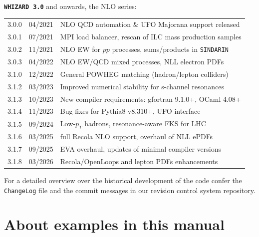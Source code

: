\documentclass[12pt]{book}
\newcommand{\ttt}[1]{\texttt{#1}}
\newcommand{\whizard}{\ttt{WHIZARD}}
\newcommand{\sindarin}{\ttt{SINDARIN}}
\begin{document}
\vspace{2cm}

{
{\bf \whizard\ \texttt{3.0}} and onwards, the NLO series:
\nopagebreak[4]
\begin{center}
  \begin{tabular}{|l|l|l|}\hline
    3.0.0 & 04/2021 & NLO QCD automation \& UFO Majorana support
    released
    \\
    3.0.1 & 07/2021 & MPI load balancer, rescan of ILC mass production
    samples
    \\
    3.0.2 & 11/2021 & NLO EW for $pp$ processes, sums/products in
    \sindarin\
    \\
    3.0.3 & 04/2022 & NLO EW/QCD mixed processes, NLL electron PDFs
    \\\hline
    3.1.0 & 12/2022 & General POWHEG matching (hadron/lepton colliders)
    \\
    3.1.2 & 03/2023 & Improved numerical stability for s-channel
    resonances
    \\
    3.1.3 & 10/2023 & New compiler requirements: gfortran 9.1.0+,
    OCaml 4.08+
    \\
    3.1.4 & 11/2023 & Bug fixes for Pythia8 v8.310+, UFO interface
    \\
    3.1.5 & 09/2024 & Low-$p_T$ hadrons, resonance-aware FKS for LHC
    \\
    3.1.6 & 03/2025 & full Recola NLO support, overhaul of NLL ePDFs
    \\
    3.1.7 & 09/2025 & EVA overhaul, updates of minimal compiler
    versions
    \\
    3.1.8 & 03/2026 & Recola/OpenLoops and lepton PDFs enhancements
    \\\hline\hline
  \end{tabular}
\end{center}
}

\vspace{.5cm}

For a detailed overview over the historical development of the code
confer the \ttt{ChangeLog} file and the commit messages in our
revision control system repository.

\newpage


\section{About examples in this manual}
\end{document}
